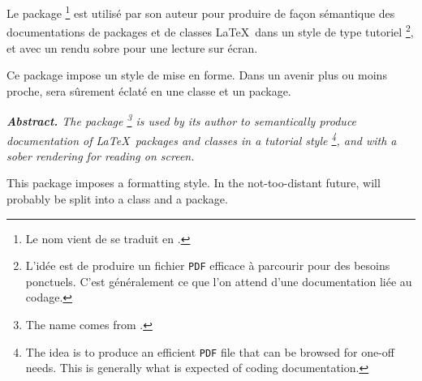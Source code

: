 \documentclass[12pt, a4paper]{article}
\begin{document}
Le package 
\footnote{
    Le nom vient de  se traduit en .
}
est utilisé par son auteur pour produire de façon sémantique des documentations de packages et de classes \LaTeX\ dans un style de type tutoriel
\footnote{
    L'idée est de produire un fichier \texttt{PDF} efficace à parcourir pour des besoins ponctuels. C'est généralement ce que l'on attend d'une documentation liée au codage.
},
et avec un rendu sobre pour une lecture sur écran.


\begin{tdocnote}
     Ce package impose un style de mise en forme.
    Dans un avenir plus ou moins proche,  sera sûrement éclaté en une classe et un package.
\end{tdocnote}

\tdocsep

{\small\itshape
\textbf{Abstract.}
The  package
\footnote{
    The name comes from .
}
is used by its author to semantically produce documentation of \LaTeX\ packages and classes in a tutorial style
\footnote{
    The idea is to produce an efficient \texttt{PDF} file that can be browsed for one-off needs. This is generally what is expected of coding documentation.
},
and with a sober rendering for reading on screen.


\begin{tdocnote}
     This package imposes a formatting style. In the not-too-distant future,  will probably be split into a class and a package.
\end{tdocnote}
}
\end{document}
